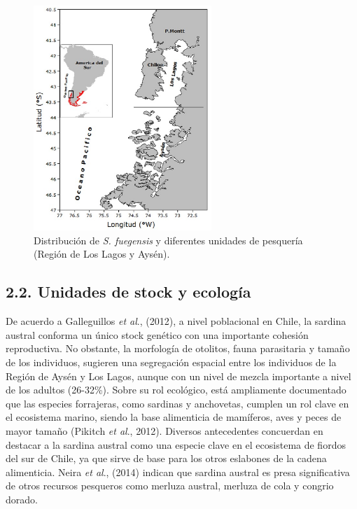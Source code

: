 \documentclass[
  spanish,
]{article}
\begin{document}
\begin{figure}[htb!]
\centering
\includegraphics[width=0.6\textwidth]{Figuras/Fig1.pdf}
\caption{Distribución de \textit{S. fuegensis} y diferentes unidades de pesquería (Región de Los Lagos y Aysén).}
\label{Fig1}
\end{figure}

\pagebreak

\hypertarget{unidades-de-stock-y-ecologuxeda}{%
\subsection{2.2. Unidades de stock y
ecología}\label{unidades-de-stock-y-ecologuxeda}}

De acuerdo a Galleguillos \emph{et al}., (2012), a nivel poblacional en
Chile, la sardina austral conforma un único stock genético con una
importante cohesión reproductiva. No obstante, la morfología de
otolitos, fauna parasitaria y tamaño de los individuos, sugieren una
segregación espacial entre los individuos de la Región de Aysén y Los
Lagos, aunque con un nivel de mezcla importante a nivel de los adultos
(26-32\%). Sobre su rol ecológico, está ampliamente documentado que las
especies forrajeras, como sardinas y anchovetas, cumplen un rol clave en
el ecosistema marino, siendo la base alimenticia de mamíferos, aves y
peces de mayor tamaño (Pikitch \emph{et al}., 2012). Diversos
antecedentes concuerdan en destacar a la sardina austral como una
especie clave en el ecosistema de fiordos del sur de Chile, ya que sirve
de base para los otros eslabones de la cadena alimenticia. Neira
\emph{et al}., (2014) indican que sardina austral es presa significativa
de otros recursos pesqueros como merluza austral, merluza de cola y
congrio dorado.
\end{document}
